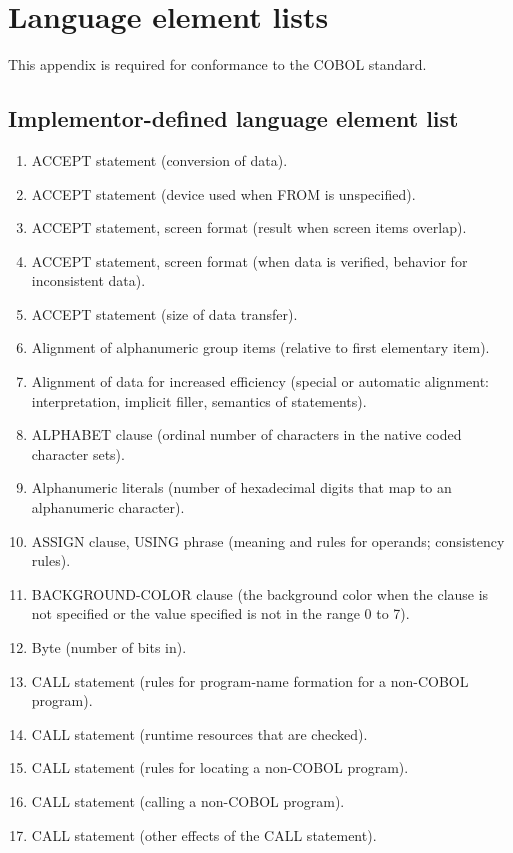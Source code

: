 \chapter{Language element lists}

This appendix is required for conformance to the COBOL standard.

\section{Implementor-defined language element list}

\begin{enumerate}
\item ACCEPT statement (conversion of data).
\item ACCEPT statement (device used when FROM is unspecified).
\item ACCEPT statement, screen format (result when screen items overlap).
\item ACCEPT statement, screen format (when data is verified, behavior for inconsistent data).
\item ACCEPT statement (size of data transfer).
\item Alignment of alphanumeric group items (relative to first elementary item).
\item Alignment of data for increased efficiency (special or automatic alignment: interpretation, implicit filler,
  semantics of statements).
\item ALPHABET clause (ordinal number of characters in the native coded character sets).
\item Alphanumeric literals (number of hexadecimal digits that map to an alphanumeric character).
\item ASSIGN clause, USING phrase (meaning and rules for operands; consistency rules).
\item BACKGROUND-COLOR clause (the background color when the clause is not specified or the value specified is not in the range 0 to 7).
\item Byte (number of bits in).
\item CALL statement (rules for program-name formation for a non-COBOL program).
\item CALL statement (runtime resources that are checked).
\item CALL statement (rules for locating a non-COBOL program).
\item CALL statement (calling a non-COBOL program).
\item CALL statement (other effects of the CALL statement).

\end{enumerate}

